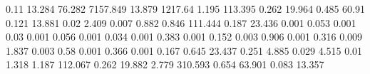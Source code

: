 0.11       13.284     %
76.282     7157.849   %
13.879     1217.64    %
1.195      113.395    %
0.262      19.964     %
0.485      60.91      %
0.121      13.881     %
0.02       2.409      %
0.007      0.882      %
0.846      111.444    %
0.187      23.436     %
0.001      0.053      %
0.001      0.03       %
0.001      0.056      %
0.001      0.034      %
0.001      0.383      %
0.001      0.152      %
0.003      0.906      %
0.001      0.316      %
0.009      1.837      %
0.003      0.58       %
0.001      0.366      %
0.001      0.167      %
0.645      23.437     %
0.251      4.885      %
0.029      4.515      %
0.01       1.318      %
1.187      112.067    %
0.262      19.882     %
2.779      310.593    %
0.654      63.901     %
0.083      13.357     %
